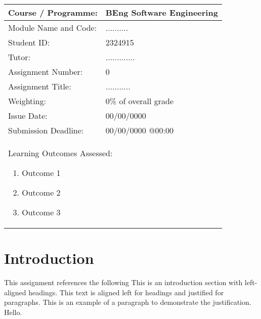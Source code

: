 \documentclass[12pt]{article}
\begin{document}
\begin{table}[h]
  \centering
  \begin{tabular}{|l|l|}
      \hline
      Course / Programme: & BEng Software Engineering \\
      \hline
      Module Name and Code: & .......... \\
      \hline
      Student ID: & 2324915 \\
      \hline
      Tutor: & ............. \\
      \hline
      Assignment Number: & 0 \\
      \hline
      Assignment Title: & ........... \\
      \hline
      Weighting: & 0\% of overall grade \\
      \hline
      Issue Date: & 00/00/0000 \\
      \hline
      Submission Deadline: & 00/00/0000 @00:00 \\
      \hline
      \multicolumn{2}{|l|}{
        \begin{minipage}{\dimexpr\textwidth-2\tabcolsep\relax} %
        \vspace{8pt} %
        Learning Outcomes Assessed:
          \begin{enumerate}
            \item Outcome 1
            \item Outcome 2
            \item Outcome 3
          \end{enumerate}
          \vspace{8pt} %
        \end{minipage}
      } \\
      \hline
  \end{tabular}
\end{table}

\newpage

\tableofcontents

\newpage 

\section{Introduction}
\label{sec:introduction}
This assignment references the following \cite{flanagan_2011_javascript}
This is an introduction section with left-aligned headings. This text is aligned left for headings and justified for paragraphs. This is an example of a paragraph to demonstrate the justification. Hello.
\end{document}
